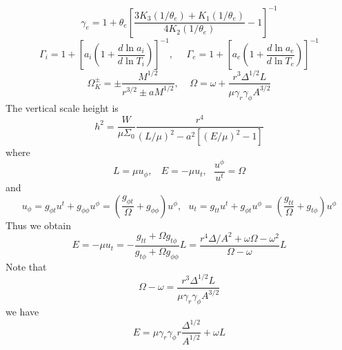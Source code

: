 \documentclass[12pt]{book}
\begin{document}
\begin{equation}
 \gamma_e=1+\theta_e\left[\frac{3K_3(1/\theta_e)+K_1(1/\theta_e)}{4K_2(1/\theta_e)}-1\right]^{-1}
\end{equation}
\begin{equation}
 \Gamma_i=1+\left[a_i\left(1+\frac{d\ln a_i}{d\ln T_i}\right)\right]^{-1},~~~~~~
\Gamma_e=1+\left[a_e\left(1+\frac{d\ln a_e}{d\ln T_e}\right)\right]^{-1}
\end{equation}
\begin{equation}
 \Omega_K^{\pm}=\pm\frac{M^{1/2}}{r^{3/2}\pm aM^{1/2}},~~~~~
\Omega=\omega +\frac{r^3 \Delta^{1/2} L}{\mu \gamma_r\gamma_\phi A^{3/2}}
\end{equation}
The vertical scale height is 
\begin{equation}
h^2=\frac{W}{\mu\Sigma_{0}}\frac{r^4}{(L/\mu)^2-a^2[(E/\mu)^2-1]}
\end{equation}
where
\begin{equation}
 L=\mu u_{\phi},~~~~E=-\mu u_{t},~~~\frac{u^{\phi}}{u^{t}}=\Omega
\end{equation}
and
\begin{equation}
 u_{\phi}=g_{\phi t}u^t+g_{\phi\phi}u^\phi=\left(\frac{g_{\phi t}}{\Omega}+g_{\phi\phi}\right)u^{\phi},
~~~u_{t}=g_{tt}u^t+g_{\phi t}u^\phi=\left(\frac{g_{t t}}{\Omega}+g_{t\phi}\right)u^{\phi}
\end{equation}
Thus we obtain
\begin{equation}
 E=-\mu u_{t}=-\frac{g_{tt}+\Omega g_{t\phi}}{g_{t\phi}+\Omega g_{\phi\phi}}L
=\frac{r^4\Delta/A^2+\omega\Omega-\omega^2}{\Omega-\omega}L
\end{equation}
Note that
\begin{equation}
 \Omega-\omega=\frac{r^3 \Delta^{1/2} L}{\mu \gamma_r\gamma_\phi A^{3/2}}
\end{equation}
we have
\begin{equation}
E=\mu\gamma_r\gamma_\phi r\frac{\Delta^{1/2}}{A^{1/2}}+\omega L
\end{equation}
\end{document}
